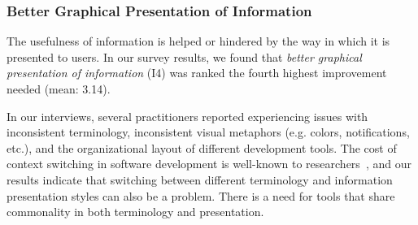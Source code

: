 \subsubsection{Better Graphical Presentation of Information}
The usefulness of information is helped or hindered by the way in which it is presented to users.
In our survey results, we found that \textit{better graphical presentation of information} (I4) was ranked the fourth highest improvement needed (mean: 3.14).

In our interviews, several practitioners reported experiencing issues with inconsistent terminology, inconsistent visual metaphors (e.g. colors, notifications, etc.), and the organizational layout of different development tools.
The cost of context switching in software development is well-known to researchers~\cite{czerwinski2004taskswitching, li2007cost_of_context_switch, blackwell2002attentioninvestment, convertino2003dualview}, and our results indicate that switching between different terminology and information presentation styles can also be a problem.
There is a need for tools that share commonality in both terminology and presentation. 



